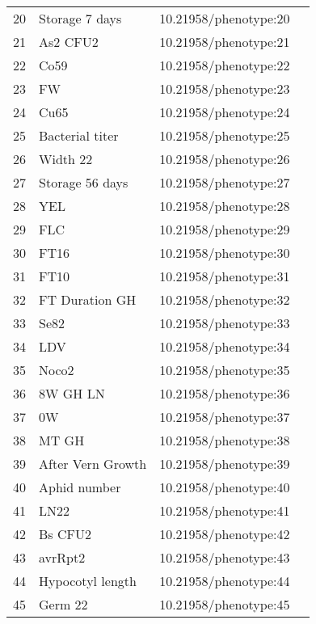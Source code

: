 \begin{longtable}{p{} p{} p{} p{}}
 20 & Storage 7 days & 10.21958/phenotype:20 & \cite{atwell2010}\\
 21 & As2 CFU2 & 10.21958/phenotype:21 & \cite{atwell2010}\\
 22 & Co59 & 10.21958/phenotype:22 & \cite{atwell2010}\\
 23 & FW & 10.21958/phenotype:23 & \cite{atwell2010}\\
 24 & Cu65 & 10.21958/phenotype:24 & \cite{atwell2010}\\
 25 & Bacterial titer & 10.21958/phenotype:25 & \cite{atwell2010}\\
 26 & Width 22 & 10.21958/phenotype:26 & \cite{atwell2010}\\
 27 & Storage 56 days & 10.21958/phenotype:27 & \cite{atwell2010}\\
 28 & YEL & 10.21958/phenotype:28 & \cite{atwell2010}\\
 29 & FLC & 10.21958/phenotype:29 & \cite{atwell2010}\\
 30 & FT16 & 10.21958/phenotype:30 & \cite{atwell2010}\\
 31 & FT10 & 10.21958/phenotype:31 & \cite{atwell2010}\\
 32 & FT Duration GH & 10.21958/phenotype:32 & \cite{atwell2010}\\
 33 & Se82 & 10.21958/phenotype:33 & \cite{atwell2010}\\
 34 & LDV & 10.21958/phenotype:34 & \cite{atwell2010}\\
 35 & Noco2 & 10.21958/phenotype:35 & \cite{atwell2010}\\
 36 & 8W GH LN & 10.21958/phenotype:36 & \cite{atwell2010}\\
 37 & 0W & 10.21958/phenotype:37 & \cite{atwell2010}\\
 38 & MT GH & 10.21958/phenotype:38 & \cite{atwell2010}\\
 39 & After Vern Growth & 10.21958/phenotype:39 & \cite{atwell2010}\\
 40 & Aphid number & 10.21958/phenotype:40 & \cite{atwell2010}\\
 41 & LN22 & 10.21958/phenotype:41 & \cite{atwell2010}\\
 42 & Bs CFU2 & 10.21958/phenotype:42 & \cite{atwell2010}\\
 43 & avrRpt2 & 10.21958/phenotype:43 & \cite{atwell2010}\\
 44 & Hypocotyl length & 10.21958/phenotype:44 & \cite{atwell2010}\\
 45 & Germ 22 & 10.21958/phenotype:45 & \cite{atwell2010}\\

\end{longtable}

